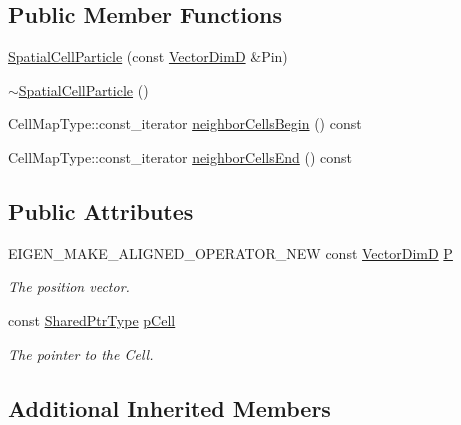 \subsection*{Public Member Functions}
\begin{DoxyCompactItemize}
\item 
\hyperlink{structmodel_1_1_spatial_cell_particle_ab070237869255577baf6fcd801849975}{Spatial\+Cell\+Particle} (const \hyperlink{structmodel_1_1_spatial_cell_particle_a924d94d0c762c92744fae31f43b920e4}{Vector\+Dim\+D} \&Pin)
\item 
\hyperlink{structmodel_1_1_spatial_cell_particle_a873c45cc666b5f49b77d79141ac69976}{$\sim$\+Spatial\+Cell\+Particle} ()
\item 
Cell\+Map\+Type\+::const\+\_\+iterator \hyperlink{structmodel_1_1_spatial_cell_particle_ade114de79d6256d0fb7858a00a386860}{neighbor\+Cells\+Begin} () const 
\item 
Cell\+Map\+Type\+::const\+\_\+iterator \hyperlink{structmodel_1_1_spatial_cell_particle_ad8e49b166996f046293acd5e6509db53}{neighbor\+Cells\+End} () const 
\end{DoxyCompactItemize}
\subsection*{Public Attributes}
\begin{DoxyCompactItemize}
\item 
E\+I\+G\+E\+N\+\_\+\+M\+A\+K\+E\+\_\+\+A\+L\+I\+G\+N\+E\+D\+\_\+\+O\+P\+E\+R\+A\+T\+O\+R\+\_\+\+N\+E\+W const \hyperlink{structmodel_1_1_spatial_cell_particle_a924d94d0c762c92744fae31f43b920e4}{Vector\+Dim\+D} \hyperlink{structmodel_1_1_spatial_cell_particle_a10501e9ca7269c96bd94374c72400cda}{P}
\begin{DoxyCompactList}\small\item\em The position vector. \end{DoxyCompactList}\item 
const \hyperlink{structmodel_1_1_spatial_cell_particle_af80891fc642ed8010429583dfb1b1009}{Shared\+Ptr\+Type} \hyperlink{structmodel_1_1_spatial_cell_particle_aeb09c09a5ce9ce6d4d849dd1d7232aa4}{p\+Cell}
\begin{DoxyCompactList}\small\item\em The pointer to the Cell. \end{DoxyCompactList}\end{DoxyCompactItemize}
\subsection*{Additional Inherited Members}


